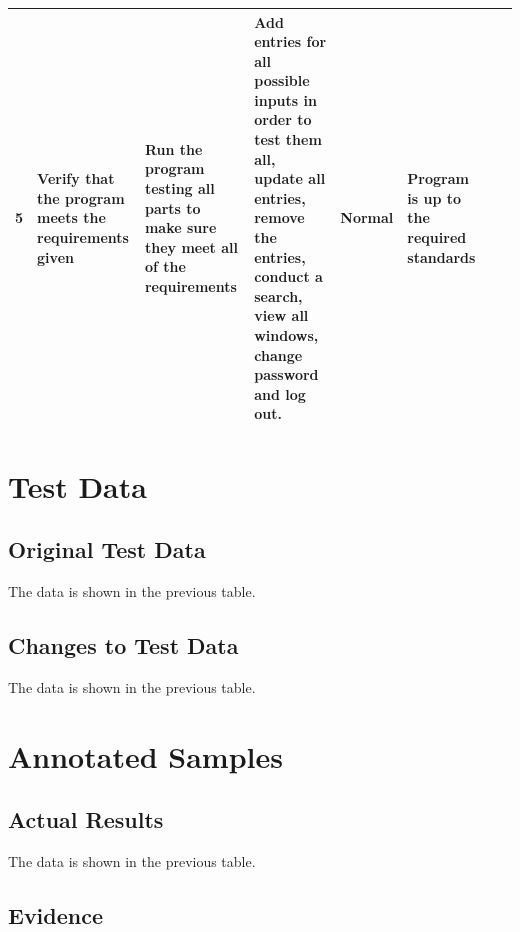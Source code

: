 \begin{landscape}
\begin{center}
\begin{longtable}{|p{1.5cm}|p{2cm}|p{2.5cm}|p{2.5cm}|p{2cm}|p{2cm}|p{2cm}|p{2cm}|}
        5 & Verify that the program meets the requirements given & Run the program testing all parts to make sure they meet all of the requirements & Add entries for all possible inputs in order to test them all, update all entries, remove the entries, conduct a search, view all windows, change password and log out. & Normal & Program is up to the required standards & & \\ \hline
    \end{longtable}
\end{center}

\section{Test Data}

\subsection{Original Test Data}

The data is shown in the previous table.

\subsection{Changes to Test Data}

The data is shown in the previous table.

\section{Annotated Samples}

\subsection{Actual Results}

The data is shown in the previous table.

\subsection{Evidence}


\end{landscape}
